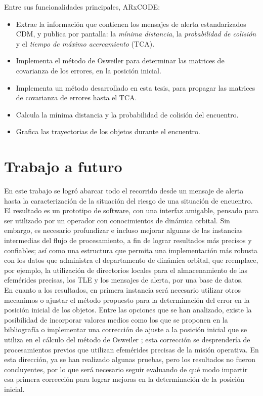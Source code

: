 Entre sus funcionalidades principales, ARxCODE:

\begin{itemize}
 \item Extrae la informaci\'on que contienen los mensajes de alerta estandarizados CDM, y publica por pantalla: la {\it{m\'inima distancia}}, la {\it{probabilidad de colisi\'on}} y el {\it{tiempo de m\'aximo acercamiento}} (TCA). 
 \item Implementa el m\'etodo de Osweiler \citep{osweiler} para determinar las matrices de covarianza de los errores, en la posici\'on inicial.
 \item Implementa un m\'etodo desarrollado en esta tesis, para propagar las matrices de covarianza de errores hasta el TCA.
 \item Calcula la m\'inima distancia y la probabilidad de colisi\'on del encuentro.
 \item Grafica las trayectorias de los objetos durante el encuentro.
\end{itemize}


\section*{Trabajo a futuro}

En este trabajo se logr\'o abarcar todo el recorrido desde un mensaje de alerta hasta la caracterizaci\'on de la situaci\'on del riesgo de una situaci\'on de encuentro. El resultado es un prototipo de software, con una interfaz amigable, pensado para ser utilizado por un operador con conocimientos de din\'amica orbital. Sin embargo, es necesario profundizar e incluso mejorar algunas de las instancias intermedias del flujo de procesamiento, a fin de lograr resultados m\'as precisos y confiables; as\'i como una estructura que permita una implementaci\'on m\'as robusta con los datos que administra el departamento de din\'amica orbital, que reemplace, por ejemplo, la utilizaci\'on de directorios locales para el almacenamiento de las efem\'erides precisas, los TLE y los mensajes de alerta, por una base de datos.\\

En cuanto a los resultados, en primera instancia ser\'a necesario utilizar otros mecanimos o ajustar el m\'etodo propuesto para la determinaci\'on del error en la posici\'on inicial de los objetos. Entre las opciones que se han analizado, existe la posibilidad de incorporar valores medios como los que se proponen en la bibliograf\'ia o implementar una correcci\'on de ajuste a la posici\'on inicial que se utiliza en el c\'alculo del m\'etodo de Osweiler \citep{osweiler}; esta correcci\'on se desprender\'ia de procesamientos previos que utilizan efem\'erides precisas de la misi\'on operativa. En esta direcci\'on, ya se han realizado algunas pruebas, pero los resultados no fueron concluyentes, por lo que ser\'a necesario seguir evaluando de qu\'e modo impartir esa primera correcci\'on para lograr mejoras en la determinaci\'on de la posici\'on inicial.\\

